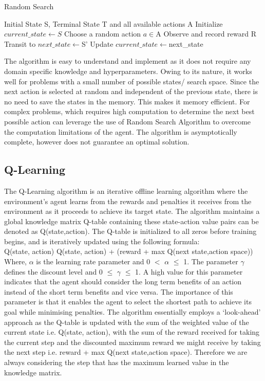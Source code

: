 \documentclass{svproc}
\begin{document}
\begin{algorithm}
\caption{Random Search}
\begin{algorithmic}[1]
\REQUIRE  Initial State S, Terminal State T and all available actions A
\STATE Initialize $current\_state \leftarrow S$
\REPEAT
\STATE Choose a random action $a \in $A 
\STATE  Observe and record reward R
\STATE Transit to $next\_state  \leftarrow $S'
\STATE Update $current\_state \leftarrow $next\_state
\end{algorithmic}
\end{algorithm}


The algorithm is easy to understand and implement as it does not require any domain specific knowledge and hyperparameters. Owing to its nature, it works well for problems with a small number of possible states/ search space. Since the next action is selected at random and independent of the previous state, there is no need to save the states in the memory. This makes it memory efficient. For complex problems, which requires high computation to determine the next best possible action can leverage the use of Random Search Algorithm to overcome the computation limitations of the agent.
The algorithm is asymptotically complete, however does not guarantee an optimal solution.  

\subsection{Q-Learning}
The Q-Learning algorithm is an iterative offline learning algorithm where the environment’s agent learns from the rewards and penalties it receives from the environment as it proceeds to achieve its target state. The algorithm maintains a global knowledge matrix Q-table containing these state-action value pairs can be denoted as Q(state,action). The Q-table is initialized to all zeros before training begins, and is iteratively updated using the following formula: \\

   Q(state, action) \leftarrow Q(state, action) + (reward + max Q(next state,action space)) \\

Where, $\alpha$ is the learning rate parameter and 0 $<$ $\alpha$ $\leq$ 1. The parameter $\gamma$ defines the discount level and 0 $\leq$ $\gamma$ $\leq$ 1. A high value for this parameter indicates that the agent should consider the long term benefits of an action instead of the short term benefits and vice versa. The importance of this parameter is that it enables the agent to select the shortest path to achieve its goal while minimising penalties. The algorithm essentially employs a ‘look-ahead’ approach as the Q-table is updated with the sum of the weighted value of the current state i.e. Q(state, action), with the sum of the reward received for taking the current step and the discounted maximum reward we might receive by taking the next step i.e. reward + max Q(next state,action space). Therefore we are always considering the step that has the maximum learned value in the knowledge matrix. 
\end{document}
